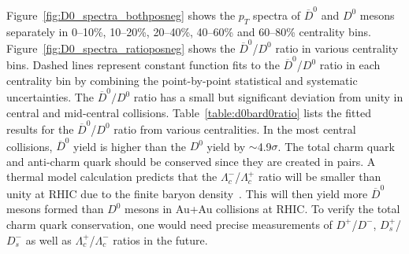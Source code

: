 \documentclass[%
 reprint,	
showpacs,
 amsmath,amssymb,
 aps,
 prc,
]{revtex4-1}
\providecommand{\DIFaddtex}[1]{{\protect\color{blue}\uwave{#1}}} %
\providecommand{\DIFaddbegin}{} %
\providecommand{\DIFaddend}{} %
\providecommand{\DIFadd}[1]{\texorpdfstring{\DIFaddtex{#1}}{#1}} %
\begin{document}
Figure~\ref{fig:D0_spectra_bothposneg} shows the $p_{T}$ spectra of $\overline{D}^{0}$ and $D^0$ mesons separately in 0--10\%, 10--20\%, 20--40\%, 40--60\% and 60--80\% centrality bins. Figure~\ref{fig:D0_spectra_ratioposneg} shows the $\overline{D}^{0}$/$D^{0}$ ratio in various centrality bins. Dashed lines represent constant function fits to the $\overline{D}^{0}$/$D^{0}$ ratio in each centrality bin by combining the point-by-point statistical and systematic uncertainties. The $\overline{D}^0/D^0$ ratio has a small but significant deviation from unity in central and mid-central collisions. Table~\ref{table:d0bard0ratio} lists the fitted results for the $\overline{D}^{0}$/$D^0$ ratio from various centralities. In the most central collisions, $\overline{D}^{0}$ yield is higher than the $D^0$ yield by $\sim$\DIFaddbegin \DIFadd{\,}\DIFaddend 4.9$\sigma$. The total charm quark and anti-charm quark should be conserved since they are created in pairs. A thermal model calculation predicts that the $\Lambda_{c}^-$/$\Lambda_{c}^+$ ratio will be smaller than unity at RHIC due to the finite baryon density~\cite{ANDRONIC200336}. This will then yield more 
$\overline{D}^{0}$ mesons formed than $D^0$ mesons in Au+Au collisions at RHIC. To verify the total charm quark conservation, one would need precise measurements of $D^{+}$/$D^{-}$, $D_{s}^{+}$/$D_{s}^{-}$ as well as $\Lambda_{c}^+$/$\Lambda_{c}^-$ ratios in the future.

\begin{table}[t]
\end{table}
\end{document}
